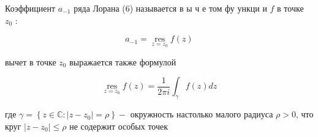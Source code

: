 \documentclass[10pt]{article}
\begin{document}
Коэффициент $a_{-1}$ ряда Лорана (6) называется в ы ч е том фу ункци и $f$ в точке $z_{0}$ :



\[

a_{-1}=\underset{z=z_{0}}{\operatorname{res}} f(z)

\]



вычет в точке $z_{0}$ выражается также формулой



\[

\underset{z=z_{0}}{\operatorname{res}} f(z)=\frac{1}{2 \pi i} \int_{\gamma} f(z) d z

\]



где $\gamma=\left\{z \in \mathbb{C}:\left|z-z_{0}\right|=\rho\right\}-$ окружность настолько малого радиуса $\rho>0$, что круг $\left|z-z_{0}\right| \leqslant \rho$ не содержит особых точек
\end{document}
